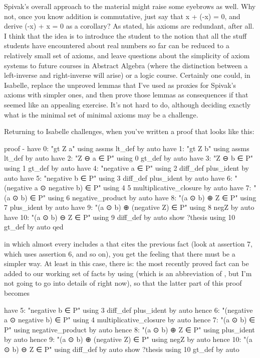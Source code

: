 Spivak's overall approach to the material might raise some eyebrows as well. Why not, once you know addition is commutative, just say that x + (-x) = 0, and derive (-x) + x = 0 as a corollary? As stated, his axioms are redundant, after all. I think that the idea is to introduce the student to the notion that all the stuff students have encountered about real numbers so far can be reduced to a relatively small set of axioms, and leave questions about the simplicity of axiom systems to future courses in Abstract Algebra (where the distinction between a left-inverse and right-inverse will arise) or a logic course. Certainly one could, in Isabelle, replace the unproved lemmas that I've used as proxies for Spivak's axioms with simpler ones, and then prove those lemmas as consequences if that seemed like an appealing exercise. It's not hard to do, although deciding exactly what is the minimal set of minimal axioms may be a challenge. 

Returning to Isabelle challenges, when you've written a proof that looks like this:

\begin{IS}
proof -
  have 0: "gt Z a" using assms lt_def by auto
  have 1: "gt Z b" using assms lt_def by auto
  have 2: "Z  ⊖  a ∈ P" using 0 gt_def by auto
  have 3: "Z  ⊖  b ∈ P" using 1 gt_def by auto
  have 4: "negative a ∈ P" using 2 diff_def plus_ident by auto
  have 5: "negative b ∈ P" using 3 diff_def plus_ident by auto
  have 6: "(negative a  ⊙  negative b) ∈ P" 
    using 4 5 multiplicative_closure  by auto
  have 7:  "(a  ⊙  b) ∈ P" using 6 negative_product by auto
  have 8:  "(a  ⊙  b) ⊕ Z ∈ P" using 7 plus_ident by auto
  have 9:  "(a  ⊙  b) ⊕ (negative Z) ∈ P" using 8 negZ by auto
  have 10:  "(a  ⊙  b)  ⊖  Z ∈ P" using 9 diff_def by auto
  show ?thesis using 10 gt_def by auto 
qed
\end{IS}

in which almost every  includes a  that cites the previous fact  (look at assertion 7, which uses assertion 6, and so on), you get the feeling that there must be a simpler way. At least in this case, there is: the most recently proved fact can be added to our working set of facts by using  (which is an abbreviation of , but I'm not going to go into details of  right now), so that the latter part of this proof becomes
\begin{IS}
  have 5: "negative b ∈ P" using 3 diff_def plus_ident by auto
  hence 6: "(negative a  ⊙  negative b) ∈ P"  using 4  multiplicative_closure  by auto
  hence 7:  "(a  ⊙  b) ∈ P" using negative_product by auto
  hence 8:  "(a  ⊙  b) ⊕ Z ∈ P" using plus_ident by auto
  hence 9:  "(a  ⊙  b) ⊕ (negative Z) ∈ P" using negZ by auto
  hence 10:  "(a  ⊙  b)  ⊖  Z ∈ P" using diff_def by auto
  show ?thesis using 10 gt_def by auto 
\end{IS}

